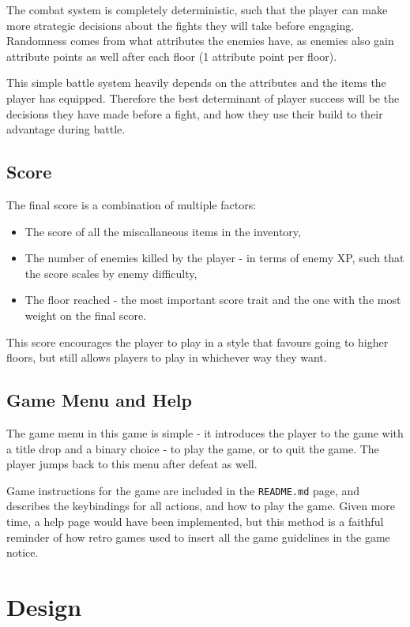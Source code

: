 \documentclass[11pt]{article}
\begin{document}
The combat system is completely deterministic, such that the player can make more strategic decisions about the fights they
will take before engaging. Randomness comes from what attributes the enemies have, as enemies also gain attribute points
as well after each floor (1 attribute point per floor).

This simple battle system heavily depends on the attributes and the items the player has equipped. Therefore the best
determinant of player success will be the decisions they have made before a fight, and how they use their build to
their advantage during battle.

\subsection{Score}
\label{sec:orgce7d897}
The final score is a combination of multiple factors:
\begin{itemize}
\item The score of all the miscallaneous items in the inventory,
\item The number of enemies killed by the player - in terms of enemy XP, such that the score scales by enemy difficulty,
\item The floor reached - the most important score trait and the one with the most weight on the final score.
\end{itemize}

This score encourages the player to play in a style that favours going to higher floors, but still allows players to play
in whichever way they want.

\subsection{Game Menu and Help}
\label{sec:org07c6afa}
The game menu in this game is simple - it introduces the player to the game with a title drop and a binary choice -
to play the game, or to quit the game. The player jumps back to this menu after defeat as well.

Game instructions for the game are included in the \texttt{README.md} page, and describes the keybindings for all actions,
and how to play the game. Given more time, a help page would have been implemented, but this method is a faithful reminder
of how retro games used to insert all the game guidelines in the game notice.

\section{Design}
\label{sec:orgba79da2}
\end{document}
